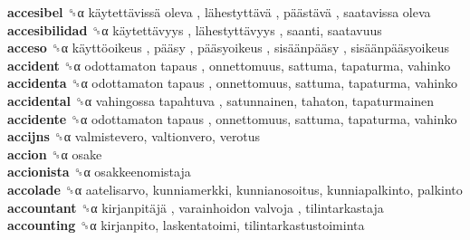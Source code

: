 \textbf{accesibel} ␝α   käytettävissä oleva ,  lähestyttävä ,  päästävä ,  saatavissa oleva   \\
\textbf{accesibilidad} ␝α   käytettävyys ,  lähestyttävyys , saanti, saatavuus  \\
\textbf{acceso} ␝α   käyttöoikeus ,  pääsy ,  pääsyoikeus ,  sisäänpääsy ,  sisäänpääsyoikeus   \\
\textbf{accident} ␝α   odottamaton tapaus , onnettomuus, sattuma, tapaturma, vahinko  \\
\textbf{accidenta} ␝α   odottamaton tapaus , onnettomuus, sattuma, tapaturma, vahinko  \\
\textbf{accidental} ␝α   vahingossa tapahtuva , satunnainen, tahaton, tapaturmainen  \\
\textbf{accidente} ␝α   odottamaton tapaus , onnettomuus, sattuma, tapaturma, vahinko  \\
\textbf{accijns} ␝α  valmistevero, valtionvero, verotus  \\
\textbf{accion} ␝α  osake  \\
\textbf{accionista} ␝α  osakkeenomistaja  \\
\textbf{accolade} ␝α  aatelisarvo, kunniamerkki, kunnianosoitus, kunniapalkinto, palkinto  \\
\textbf{accountant} ␝α   kirjanpitäjä ,  varainhoidon valvoja , tilintarkastaja  \\
\textbf{accounting} ␝α  kirjanpito, laskentatoimi, tilintarkastustoiminta  \\

